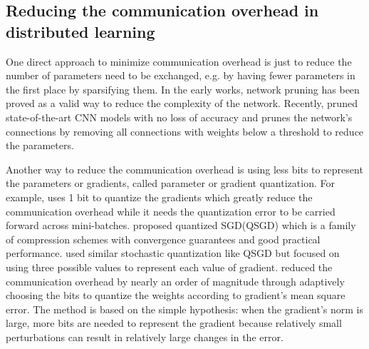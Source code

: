 \documentclass[sigconf]{acmart}
\begin{document}
\subsection{Reducing the communication overhead in distributed learning}\label{sec:RW:SRD}


One direct approach to minimize communication overhead is just to reduce the number of parameters need to be exchanged, e.g. by having fewer parameters in the first place by sparsifying them. In the early works\cite{lecun1990optimal,hanson1989comparing,hassibi1993second,strom1997phoneme}, network pruning has been proved as a valid way to reduce the complexity of the network. Recently, \citeauthor{han2016eie} pruned state-of-the-art CNN models with no loss of accuracy\cite{han2016eie} and \citeauthor{han2015deep} prunes the network's connections by removing all connections with weights below a threshold to reduce the parameters\cite{han2015deep}.

Another way to reduce the communication overhead is using less bits to represent the parameters or gradients, called parameter or gradient quantization. For example, \citeauthor{seide20141} uses 1 bit to quantize the gradients which greatly reduce the communication overhead while it needs the quantization error to be carried forward across mini-batches\cite{seide20141}. \citeauthor{alistarh2016qsgd} proposed quantized SGD(QSGD) which is a family of compression schemes with convergence guarantees and good practical performance\cite{alistarh2016qsgd}. \citeauthor{wen2017terngrad} used similar stochastic quantization like QSGD but focused on using three possible values to represent each value of  gradient\cite{wen2017terngrad}. \citeauthor{oland2015reducing} reduced the communication overhead by nearly an order of magnitude through adaptively choosing the bits to quantize the weights according to gradient's mean square error\cite{oland2015reducing}. The method is based on the simple hypothesis: when the gradient's norm is large, more bits are needed to represent the gradient because relatively small perturbations can result in relatively large changes in the error.
\end{document}
